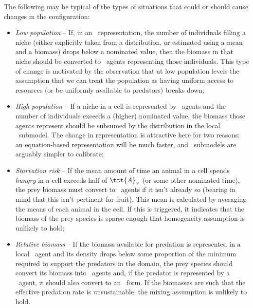 The following may be typical of the types of situations that could or
should cause changes in the con\-fig\-ur\-a\-tion:
\begin{itemize}
  \item \emph{Low population} -- If, in an \SD\ representa\-tion,
    the number of in\-di\-vidu\-als filling a niche (either explicitly taken
    from a distribution, or estimated using a mean and a biomass)
    drops below a nominated value, then the biomass in that niche
    should be converted to \IB\ agents representing those
    in\-di\-vidu\-als. This type of change is motivated by the observation
    that at low population levels the assumption that we can treat the
    population as having uniform access to resources (or be uniformly
    available to predators) breaks down;

  \item \emph{High population} -- If a niche in a cell is
    represented by \IB\ agents and the number of in\-di\-vidu\-als exceeds a
    (higher) nominated value, the biomass those agents represent
    should be subsumed by the distribution in the local
    \SD\ submodel. The change in rep\-re\-sen\-ta\-tion is attractive here for
    two reasons: an equation-based rep\-re\-sen\-ta\-tion will be much faster,
    and \SD\ submodels are arguably simpler to calibrate;

  \item \emph{Starvation risk} -- If the mean amount of time an
    animal in a cell spends \emph{hungry} in a cell exceeds half of
    $\ttt{A}_\omega$ (or some other nominated time), the prey biomass
    must convert to \IB\ agents if it isn't already so (bearing in
    mind that this isn't pertinent for fruit). This mean is calculated
    by averaging the means of each animal in the cell. If this is
    triggered, it indicates that the biomass of the prey species is
    sparse enough that homogeneity assumption is unlikely to hold;

  \item \emph{Relative biomass} -- If the biomass available for
    predation is represented in a local \SD\ agent and its density
    drops below some proportion of the minimum required to support the
    predators in the domain, the prey species should convert its
    biomass into \IB\ agents and, if the predator is represented by a
    \SD\ agent, it should also convert to an \IB\ form. If the
    biomasses are such that the effective predation rate is
    unsustainable, the mixing assumption is unlikely to hold.
\end{itemize}

